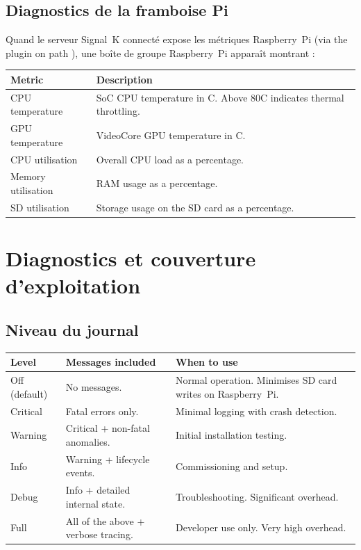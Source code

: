 \subsection{Diagnostics de la framboise Pi}

Quand le serveur Signal~K connecté expose les métriques Raspberry~Pi
(via the  plugin on path ),
une boîte de groupe Raspberry~Pi apparaît montrant :

\begin{longtable}{L{3.6cm}L{10.1cm}}
\toprule
{}
\color{white}\sffamily\bfseries Metric &
\color{white}\sffamily\bfseries Description \\
\midrule
CPU temperature   & SoC CPU temperature in \textdegree{}C. Above 80\textdegree{}C indicates thermal throttling. \\
GPU temperature   & VideoCore GPU temperature in \textdegree{}C. \\
CPU utilisation   & Overall CPU load as a percentage. \\
Memory utilisation& RAM usage as a percentage. \\
SD utilisation    & Storage usage on the SD card as a percentage. \\
\bottomrule
\end{longtable}

\section{Diagnostics et couverture d'exploitation}


\subsection{Niveau du journal}

\begin{longtable}{L{2.4cm}L{4.6cm}L{6.7cm}}
\toprule
{}
\color{white}\sffamily\bfseries Level &
\color{white}\sffamily\bfseries Messages included &
\color{white}\sffamily\bfseries When to use \\
\midrule
Off (default) & No messages. & Normal operation. Minimises SD card writes on Raspberry~Pi. \\
Critical      & Fatal errors only. & Minimal logging with crash detection. \\
Warning       & Critical + non-fatal anomalies. & Initial installation testing. \\
Info          & Warning + lifecycle events. & Commissioning and setup. \\
Debug         & Info + detailed internal state. & Troubleshooting. Significant overhead. \\
Full          & All of the above + verbose tracing. & Developer use only. Very high overhead. \\
\bottomrule
\end{longtable}

